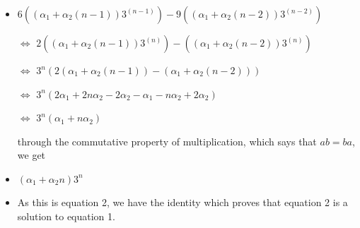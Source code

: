 \documentclass{article}
\begin{document}
\begin{enumerate}
\begin{itemize}
  \item $6((\alpha_{1}+\alpha_{2}(n-1))3^{(n-1)}) -9((\alpha_{1}+\alpha_{2}(n-2))3^{(n-2)})$
  \item [$\Leftrightarrow$]$2((\alpha_{1}+\alpha_{2}(n-1))3^{(n)}) -((\alpha_{1}+\alpha_{2}(n-2))3^{(n)})$
  \item [$\Leftrightarrow$]$3^{n}(2(\alpha_{1}+\alpha_{2}(n-1)) -(\alpha_{1}+\alpha_{2}(n-2)))$
  \item [$\Leftrightarrow$]$3^{n}(2\alpha_{1}+2n\alpha_{2}-2\alpha_{2} -\alpha_{1}-n\alpha_{2}+2\alpha_{2})$
  \item [$\Leftrightarrow$]$3^{n}(\alpha_{1}+n\alpha_{2})$
  \item [] through the commutative property of multiplication, which says that $ab=ba$, we get
  \item $(\alpha_{1}+\alpha_{2}n)3^{n}$
  \item As this is equation 2, we have the identity which proves that equation 2 is a solution to equation 1.
  \end{itemize}


\end{enumerate}
\end{document}
